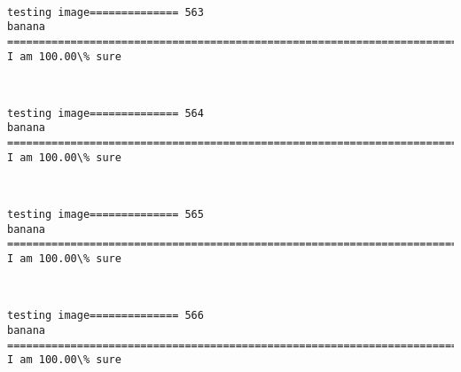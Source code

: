\documentclass[11pt]{article}
\begin{document}
    \begin{center}
    \end{center}
    { \hspace*{\fill} \\}
    
    \begin{Verbatim}[commandchars=\\\{\}]
testing image============== 563
banana
============================================================================
I am 100.00\% sure

    \end{Verbatim}

    \begin{center}
    \end{center}
    { \hspace*{\fill} \\}
    
    \begin{Verbatim}[commandchars=\\\{\}]
testing image============== 564
banana
============================================================================
I am 100.00\% sure

    \end{Verbatim}

    \begin{center}
    \end{center}
    { \hspace*{\fill} \\}
    
    \begin{Verbatim}[commandchars=\\\{\}]
testing image============== 565
banana
============================================================================
I am 100.00\% sure

    \end{Verbatim}

    \begin{center}
    \end{center}
    { \hspace*{\fill} \\}
    
    \begin{Verbatim}[commandchars=\\\{\}]
testing image============== 566
banana
============================================================================
I am 100.00\% sure

    \end{Verbatim}
\end{document}
